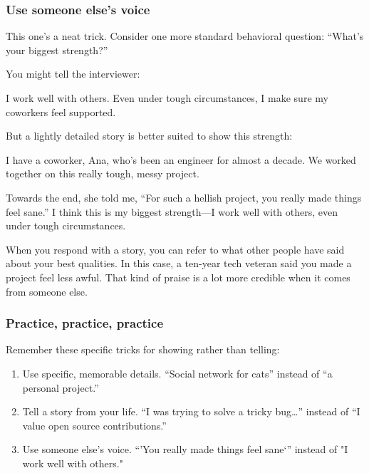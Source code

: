 \documentclass{article}
\begin{document}
\subsubsection{Use someone else’s voice}

This one’s a neat trick. Consider one more standard behavioral question: “What’s your biggest strength?”

You might tell the interviewer:

\begin{tcolorbox}
I work well with others. Even under tough circumstances, I make sure my coworkers feel supported.  
\end{tcolorbox}


But a lightly detailed story is better suited to show this strength:

\begin{tcolorbox}
  I have a coworker, Ana, who’s been an engineer for almost a decade. We worked together on this really tough, messy project.

  Towards the end, she told me, “For such a hellish project, you really made things feel sane.” I think this is my biggest strength—I work well with others, even under tough circumstances.
\end{tcolorbox}

When you respond with a story, you can refer to what other people have said about your best qualities. In this case, a ten-year tech veteran said you made a project feel less awful. That kind of praise is a lot more credible when it comes from someone else.



\subsubsection{Practice, practice, practice}

Remember these specific tricks for showing rather than telling:

\begin{enumerate}
\item Use specific, memorable details. “Social network for cats” instead of “a personal project.”
\item Tell a story from your life. “I was trying to solve a tricky bug…” instead of “I value open source contributions.”
\item Use someone else’s voice. “’You really made things feel sane‘” instead of "I work well with others."
\end{enumerate}
\end{document}

